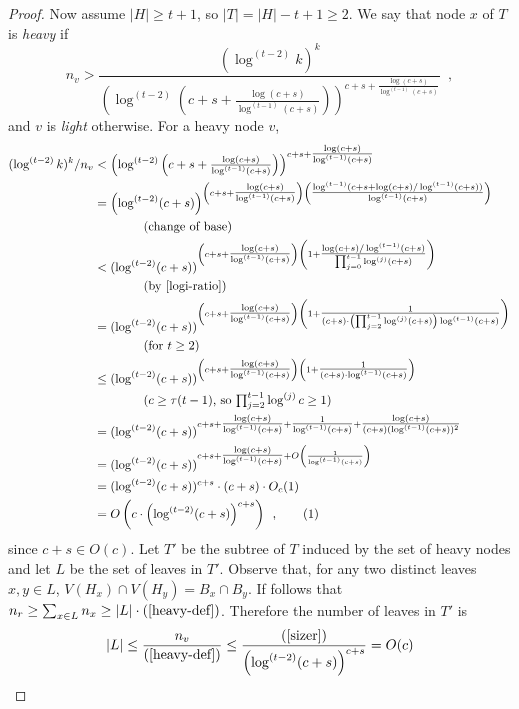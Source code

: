 \documentclass[kpfonts]{patmorin}
\newcommand\numberthis{\addtocounter{equation}{1}\tag{\theequation}}
\theoremstyle{named}
\begin{document}
\begin{proof}
    Now assume $|H|\ge t+1$, so $|T|=|H|-t+1\ge 2$.  We say that node $x$ of $T$ is \emph{heavy} if
    \begin{equation}
        n_v > \frac{(\log^{(t-2)} k)^k}{\left(\log^{(t-2)}\left(c+s+\tfrac{\log(c+s)}{\log^{(t-1)}(c+s)}\right)\right)^{c+s+\tfrac{\log(c+s)}{\log^{(t-1)}(c+s)}}} \enspace , \label{heavy-def}
    \end{equation}
    and $v$ is \emph{light} otherwise.  For a heavy node $v$,
    \begin{align*}
        (\log^{(t-2)} k)^k/n_v & < \left(\log^{(t-2)}\left(c+s+\tfrac{\log(c+s)}{\log^{(t-1)}(c+s)}\right)\right)^{c+s+\tfrac{\log(c+s)}{\log^{(t-1)}(c+s)}} \\
        & = \left(\log^{(t-2)}(c+s)\right)^{\left(c+s+\tfrac{\log(c+s)}{\log^{(t-1)}(c+s)}\right)
            \left(\tfrac{\log^{(t-1)}(c+s+\log(c+s)/\log^{(t-1)}(c+s))}{\log^{(t-1)}(c+s)}\right)} \\
            & \qquad\qquad\text{(change of base)} \\
        & < (\log^{(t-2)}(c+s))^{\left(c+s+\tfrac{\log(c+s)}{\log^{(t-1)}(c+s)}\right)
            \left(1 + \tfrac{\log(c+s)/\log^{(t-1)}(c+s)}{\prod_{j=0}^{t-1}\log^{(j)}(c+s)}\right)} \\
            & \qquad\qquad\text{(by \cref{logi-ratio})}\\
        & = (\log^{(t-2)}(c+s))^{\left(c+s+\tfrac{\log(c+s)}{\log^{(t-1)}(c+s)}\right)
            \left(1 + \tfrac{1}{(c+s)\cdot\left(\prod_{j=2}^{t-1}\log^{(j)}(c+s)\right)\log^{(t-1)}(c+s)}\right)} \\
            & \qquad\qquad\text{(for $t\ge 2$)}\\
        & \le (\log^{(t-2)}(c+s))^{\left(c+s+\tfrac{\log(c+s)}{\log^{(t-1)}(c+s)}\right)
            \left(1 + \tfrac{1}{(c+s)\cdot \log^{(t-1)}(c+s)}\right)} \\
            & \qquad\qquad\text{($c\ge \tau(t-1)$, so $\textstyle \prod_{j=2}^{t-1}\log^{(j)}c\ge 1$)} \\
        & = (\log^{(t-2)}(c+s))^{c+s+\tfrac{\log(c+s)}{\log^{(t-1)}(c+s)} +
            \tfrac{1}{\log^{(t-1)}(c+s)} + \tfrac{\log(c+s)}{(c+s)(\log^{(t-1)}(c+s))^2}}  \\
        & = (\log^{(t-2)}(c+s))^{c+s+\tfrac{\log(c+s)}{\log^{(t-1)}(c+s)} + O\left(\frac{1}{\log^{(t-1)}(c+s)}\right)}  \\
        & = (\log^{(t-2)}(c+s))^{c+s}\cdot (c+s)\cdot O_c(1) \\
        & = O\left(c\cdot\left(\log^{(t-2)}(c+s)\right)^{c+s}\right) \enspace ,
        \numberthis \label{sizer}
    \end{align*}
    since $c+s\in O(c)$.
    Let $T'$ be the subtree of $T$ induced by the set of heavy nodes and let $L$ be the set of leaves in $T'$.  Observe that, for any two distinct leaves $x,y\in L$, $V(H_x)\cap V(H_y)=B_x\cap B_y$.  If follows that $n_r\ge \sum_{x\in L} n_x\ge |L|\cdot(\ref{heavy-def})$.  Therefore the number of leaves in $T'$ is
    \[
        |L| \le \frac{n_v}{(\ref{heavy-def})} \le \frac{(\ref{sizer})}{\left(\log^{(t-2)}(c+s)\right)^{c+s}} = O(c)
    \]


\end{proof}
\end{document}
